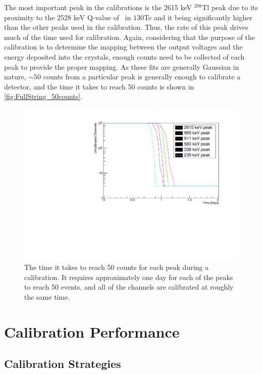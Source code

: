 The most important peak in the calibrations is the 2615 keV $^{208}$Tl peak due to its proximity to the 2528 keV Q-value of \zeronubb~in ${130}$Te and it being significantly higher than the other peaks used in the calibration.
Thus, the rate of this peak drives much of the time used for calibration.
Again, considering that the purpose of the calibration is to determine the mapping between the output voltages and the energy deposited into the crystals, enough counts need to be collected of each peak to provide the proper mapping.
As these fits are generally Gaussian in nature, $\sim50$ counts from a particular peak is generally enough to calibrate a detector, and the time it takes to reach 50 counts is shown in \autoref{fig:FullString_50counts}.
\begin{figure}
    \centering
    \includegraphics[width=0.9\linewidth]{Figures/FullString_50Counts.pdf}
    \caption[The time it takes to reach 50 counts for each peak during a calibration]
    {The time it takes to reach 50 counts for each peak during a calibration.
    It requires approximately one day for each of the peaks to reach 50 events, and all of the channels are calibrated at roughly the same time.}
    \label{fig:FullString_50counts}
\end{figure}

\section{Calibration Performance}

\subsection*{Calibration Strategies}
\label{ssec:Calibration Strategies}

